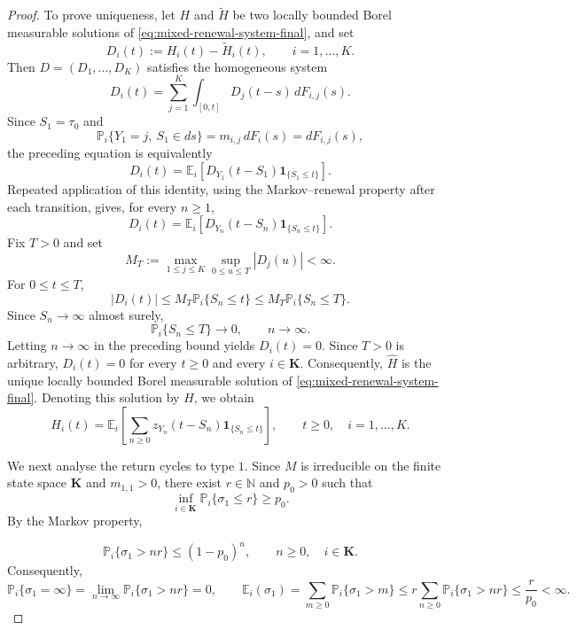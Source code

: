 \documentclass[reqno,final,11pt]{amsart}
\newcommand{\N}{\mathbb N}
\newcommand{\E}{\mathbb E}
\newcommand{\Pbb}{\mathbb P}
\newcommand{\Kk}{\mathbf K}
\newcommand{\ind}[1]{\mathbf 1_{\{#1\}}}
\theoremstyle{plain}
\theoremstyle{definition}
\theoremstyle{remark}
\numberwithin{equation}{section}
\begin{document}
\begin{proof}
To prove uniqueness, let \(H\) and \(\widetilde H\) be two locally bounded Borel measurable solutions of \eqref{eq:mixed-renewal-system-final}, and set
\[
  D_i(t):=H_i(t)-\widetilde H_i(t),
  \qquad i=1,\dots,K.
\]
Then \(D=(D_1,\dots,D_K)\) satisfies the homogeneous system
\[
  D_i(t)
  =
  \sum_{j=1}^K
  \int_{[0,t]}D_j(t-s)\,dF_{i,j}(s).
\]
Since \(S_1=\tau_0\) and
\[
  \Pbb_i\{Y_1=j,\ S_1\in ds\}
  =
  m_{i,j}\,dF_i(s)
  =
  dF_{i,j}(s),
\]
the preceding equation is equivalently
\[
  D_i(t)
  =
  \E_i\left[
    D_{Y_1}(t-S_1)\ind{S_1\le t}
  \right].
\]
Repeated application of this identity, using the Markov--renewal property after each transition, gives, for every \(n\ge1\),
\[
  D_i(t)
  =
  \E_i\left[
    D_{Y_n}(t-S_n)\ind{S_n\le t}
  \right].
\]
Fix \(T>0\) and set
\[
  M_T:=
  \max_{1\le j\le K}\sup_{0\le u\le T}|D_j(u)|<\infty.
\]
For \(0\le t\le T\),
\[
  |D_i(t)|
  \le
  M_T\Pbb_i\{S_n\le t\}
  \le
  M_T\Pbb_i\{S_n\le T\}.
\]
Since \(S_n\to\infty\) almost surely,
\[
  \Pbb_i\{S_n\le T\}\longrightarrow0,
  \qquad n\to\infty.
\]
Letting \(n\to\infty\) in the preceding bound yields \(D_i(t)=0\). Since \(T>0\) is arbitrary, \(D_i(t)=0\) for every \(t\ge0\) and every \(i\in\Kk\). Consequently, \(\widehat H\) is the unique locally bounded Borel measurable solution of \eqref{eq:mixed-renewal-system-final}. Denoting this solution by \(H\), we obtain
\begin{equation}\label{eq:renewal-representation-final}
  H_i(t)
  =
  \E_i\left[
    \sum_{n\ge0}
    z_{Y_n}(t-S_n)\ind{S_n\le t}
  \right],
  \qquad t\ge0,\quad i=1,\dots,K.
\end{equation}

We next analyse the return cycles to type \(1\). Since \(M\) is irreducible on the finite state space \(\Kk\) and \(m_{1,1}>0\), there exist \(r\in\N\) and \(p_0>0\) such that
\[
  \inf_{i\in\Kk}\Pbb_i\{\sigma_1\le r\}\ge p_0.
\]
By the Markov property,

\begin{equation}\label{eq:return-exp-tail-final}
  \Pbb_i\{\sigma_1>nr\}\le(1-p_0)^n,\qquad n\ge0,\quad i\in\Kk.
\end{equation}
Consequently,
\[
  \Pbb_i\{\sigma_1=\infty\}=\lim_{n\to\infty}\Pbb_i\{\sigma_1>nr\}=0,\qquad \E_i(\sigma_1)=\sum_{m\ge0}\Pbb_i\{\sigma_1>m\}\le r\sum_{n\ge0}\Pbb_i\{\sigma_1>nr\}\le\frac{r}{p_0}<\infty.
\]


\end{proof}
\end{document}
